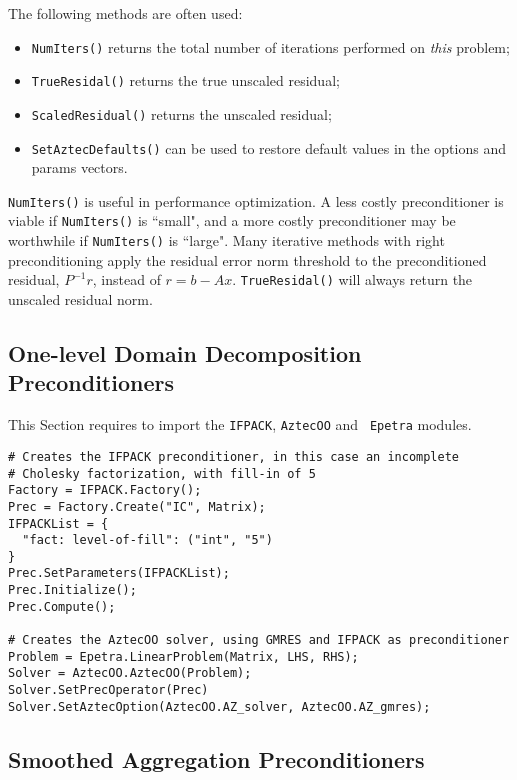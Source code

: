 \documentclass[10pt,relax]{SANDreport}
\begin{document}
The following methods are often used:
\begin{itemize}
\item \verb!NumIters()! returns the total number of iterations performed
  on {\sl this} problem;
\item \verb!TrueResidal()! returns the true unscaled residual;
\item \verb!ScaledResidual()! returns the unscaled residual;
\item \verb!SetAztecDefaults()! can be used to restore default values in
  the options and params vectors.
\end{itemize}
\verb!NumIters()! is useful in performance optimization.
A less costly preconditioner is viable if \verb!NumIters()! is ``small",
and a more costly preconditioner may be worthwhile if \verb!NumIters()! is ``large".
Many iterative methods with right preconditioning
apply the residual error norm threshold to the preconditioned residual,
$P^{-1}r$, instead of $r=b-Ax$.
\verb!TrueResidal()! will always return the unscaled residual norm.

\subsection{One-level Domain Decomposition Preconditioners}
\label{sec:dd}

This Section requires to import the {\tt IFPACK}, {\tt AztecOO} and {\tt
  Epetra} modules.

\begin{verbatim}
# Creates the IFPACK preconditioner, in this case an incomplete
# Cholesky factorization, with fill-in of 5
Factory = IFPACK.Factory();
Prec = Factory.Create("IC", Matrix);
IFPACKList = {
  "fact: level-of-fill": ("int", "5")
}
Prec.SetParameters(IFPACKList);
Prec.Initialize();
Prec.Compute();

# Creates the AztecOO solver, using GMRES and IFPACK as preconditioner
Problem = Epetra.LinearProblem(Matrix, LHS, RHS);
Solver = AztecOO.AztecOO(Problem);
Solver.SetPrecOperator(Prec)
Solver.SetAztecOption(AztecOO.AZ_solver, AztecOO.AZ_gmres);
\end{verbatim}


\subsection{Smoothed Aggregation Preconditioners}
\label{sec:prec}
\end{document}
